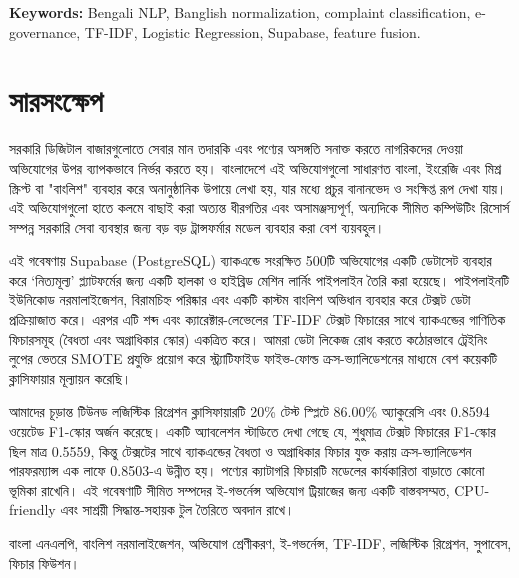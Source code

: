 \documentclass[12pt,a4paper,openany]{book}
\newcommand{\bn}[1]{{\banglafont #1}}
\newcommand{\bn}[1]{#1}
\begin{document}
\noindent \textbf{Keywords:} Bengali NLP, Banglish normalization, complaint classification, e-governance, TF-IDF, Logistic Regression, Supabase, feature fusion.

\clearpage

\chapter*{\bn{সারসংক্ষেপ}}
\addcontentsline{toc}{chapter}{\bn{সারসংক্ষেপ}}
\bn{সরকারি ডিজিটাল বাজারগুলোতে সেবার মান তদারকি এবং পণ্যের অসঙ্গতি সনাক্ত করতে নাগরিকদের দেওয়া অভিযোগের উপর ব্যাপকভাবে নির্ভর করতে হয়। বাংলাদেশে এই অভিযোগগুলো সাধারণত বাংলা, ইংরেজি এবং মিশ্র স্ক্রিপ্ট বা "বাংলিশ" ব্যবহার করে অনানুষ্ঠানিক উপায়ে লেখা হয়, যার মধ্যে প্রচুর বানানভেদ ও সংক্ষিপ্ত রূপ দেখা যায়। এই অভিযোগগুলো হাতে কলমে বাছাই করা অত্যন্ত ধীরগতির এবং অসামঞ্জস্যপূর্ণ, অন্যদিকে সীমিত কম্পিউটিং রিসোর্স সম্পন্ন সরকারি সেবা ব্যবস্থার জন্য বড় বড় ট্রান্সফর্মার মডেল ব্যবহার করা বেশ ব্যয়বহুল।}

\bn{এই গবেষণায় }\mbox{Supabase}\bn{ (}\mbox{PostgreSQL}\bn{) ব্যাকএন্ডে সংরক্ষিত }500\bn{টি অভিযোগের একটি ডেটাসেট ব্যবহার করে ‘নিত্যমূল্য’ প্ল্যাটফর্মের জন্য একটি হালকা ও হাইব্রিড মেশিন লার্নিং পাইপলাইন তৈরি করা হয়েছে। পাইপলাইনটি ইউনিকোড নরমালাইজেশন, বিরামচিহ্ন পরিষ্কার এবং একটি কাস্টম বাংলিশ অভিধান ব্যবহার করে টেক্সট ডেটা প্রক্রিয়াজাত করে। এরপর এটি শব্দ এবং ক্যারেক্টার-লেভেলের }TF-IDF\bn{ টেক্সট ফিচারের সাথে ব্যাকএন্ডের গাণিতিক ফিচারসমূহ (বৈধতা এবং অগ্রাধিকার স্কোর) একত্রিত করে। আমরা ডেটা লিকেজ রোধ করতে কঠোরভাবে ট্রেইনিং লুপের ভেতরে }SMOTE\bn{ প্রযুক্তি প্রয়োগ করে স্ট্র্যাটিফাইড ফাইভ-ফোল্ড ক্রস-ভ্যালিডেশনের মাধ্যমে বেশ কয়েকটি ক্লাসিফায়ার মূল্যায়ন করেছি।}

\bn{আমাদের চূড়ান্ত টিউনড লজিস্টিক রিগ্রেশন ক্লাসিফায়ারটি }20\%\bn{ টেস্ট স্প্লিটে }86.00\%\bn{ অ্যাকুরেসি এবং }0.8594\bn{ ওয়েটেড }F1\bn{-স্কোর অর্জন করেছে। একটি অ্যাবলেশন স্টাডিতে দেখা গেছে যে, শুধুমাত্র টেক্সট ফিচারের }F1\bn{-স্কোর ছিল মাত্র }0.5559\bn{, কিন্তু টেক্সটের সাথে ব্যাকএন্ডের বৈধতা ও অগ্রাধিকার ফিচার যুক্ত করায় ক্রস-ভ্যালিডেশন পারফরম্যান্স এক লাফে }0.8503\bn{-এ উন্নীত হয়। পণ্যের ক্যাটাগরি ফিচারটি মডেলের কার্যকারিতা বাড়াতে কোনো ভূমিকা রাখেনি। এই গবেষণাটি সীমিত সম্পদের ই-গভর্নেন্স অভিযোগ ট্রিয়াজের জন্য একটি বাস্তবসম্মত, }CPU-friendly\bn{ এবং সাশ্রয়ী সিদ্ধান্ত-সহায়ক টুল তৈরিতে অবদান রাখে।}

\vspace{1.5em}
\noindent \bn{\textbf{মূলশব্দ:}} \bn{বাংলা এনএলপি, বাংলিশ নরমালাইজেশন, অভিযোগ শ্রেণীকরণ, ই-গভর্নেন্স, }TF-IDF\bn{, লজিস্টিক রিগ্রেশন, }\mbox{\bn{সুপাবেস}}\bn{, ফিচার ফিউশন।}
\tableofcontents
\listoffigures
\listoftables
\end{document}
